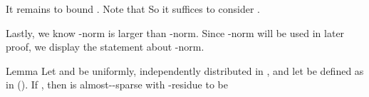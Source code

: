 It remains to bound .
Note that
So it suffices to consider .

Lastly, we know -norm is larger than -norm.
Since -norm will be used in later proof, we display the statement about -norm.

\Result
{Lemma}
{
Let  and  be uniformly, independently distributed in \m {[0,2\pi)}, and let  be defined as in ().
If , then  is almost--sparse with -residue  to be
}

\stopsubsection
\stopsection

